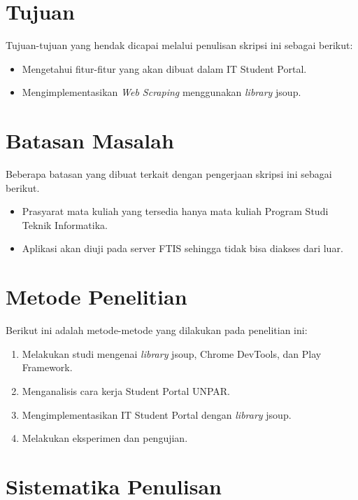 \section{Tujuan}
\label{sec:tujuan}

Tujuan-tujuan yang hendak dicapai melalui penulisan skripsi ini sebagai berikut:
\begin{itemize}
	\item	Mengetahui fitur-fitur yang akan dibuat dalam IT Student Portal.
	\item	Mengimplementasikan \textit{Web Scraping} menggunakan \textit{library} jsoup.
\end{itemize}

\section{Batasan Masalah}
\label{sec:batasan_masalah}

Beberapa batasan yang dibuat terkait dengan pengerjaan skripsi ini sebagai berikut.
\begin{itemize}
	\item Prasyarat mata kuliah yang tersedia hanya mata kuliah Program Studi Teknik Informatika.
	\item Aplikasi akan diuji pada server FTIS sehingga tidak bisa diakses dari luar.
\end{itemize}

\section{Metode Penelitian}
\label{sec:metode_penelitian}

Berikut ini adalah metode-metode yang dilakukan pada penelitian ini:

\begin{enumerate}
	\item Melakukan studi mengenai \textit{library} jsoup, Chrome DevTools, dan Play Framework.
	\item Menganalisis cara kerja Student Portal UNPAR.
	\item Mengimplementasikan IT Student Portal dengan \textit{library} jsoup.
	\item Melakukan eksperimen dan pengujian.
\end{enumerate}

\section{Sistematika Penulisan}
\label{sec:sistematika_penulisan}

